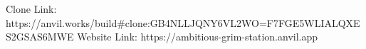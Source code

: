 Clone Link: https://anvil.works/build#clone:GB4NLLJQNY6VL2WO=F7FGE5WLIALQXES2GSAS6MWE
Website Link: https://ambitious-grim-station.anvil.app